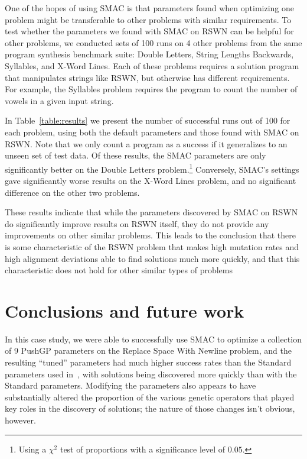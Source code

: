 One of the hopes of using SMAC is that parameters found when optimizing one problem might be transferable to other problems with similar requirements. To test whether the parameters we found with SMAC on RSWN can be helpful for other problems, we conducted sets of 100 runs on 4 other problems from the same program synthesis benchmark suite: Double Letters, String Lengths Backwards, Syllables, and X-Word Lines. Each of these problems requires a solution program that manipulates strings like RSWN, but otherwise has different requirements. For example, the Syllables problem requires the program to count the number of vowels in a given input string.

In Table~\ref{table:results} we present the number of successful runs out of 100 for each problem, using both the default parameters and those found with SMAC on RSWN. Note that we only count a program as a success if it generalizes to an unseen set of test data. Of these results, the SMAC parameters are only significantly better on the Double Letters problem.\footnote{Using a $\chi^2$ test of proportions with a significance level of $0.05$.} 
Conversely, SMAC's settings gave significantly worse results on the X-Word Lines problem, and no significant difference on the other two problems.

These results indicate that while the parameters discovered by SMAC on RSWN do significantly improve results on RSWN itself, they do not provide any improvements on other similar problems. This leads to the conclusion that there is some characteristic of the RSWN problem that makes high mutation rates and high alignment deviations able to find solutions much more quickly, and that this characteristic does not hold for other similar types of problems

\section{Conclusions and future work}
\label{sec:conclusionsAndFutureWork}

In this case study, we were able to successfully use SMAC to optimize a 
collection of 9 PushGP parameters on the Replace Space With Newline problem, 
and the resulting ``tuned'' parameters had much higher success rates than the
Standard parameters used in~\cite{Helmuth:2015:GECCO}, with solutions 
being discovered more quickly than with the Standard parameters.
Modifying the parameters also appears to have substantially altered the
proportion of the various genetic operators that played key roles in the
discovery of solutions; the nature of those changes isn't obvious, however.

